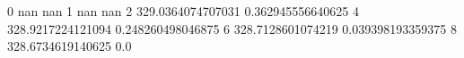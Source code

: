 0 nan nan
1 nan nan
2 329.0364074707031 0.362945556640625
4 328.9217224121094 0.248260498046875
6 328.7128601074219 0.039398193359375
8 328.6734619140625 0.0
